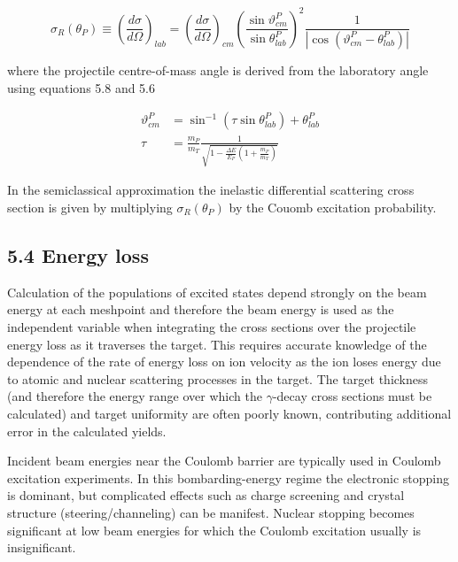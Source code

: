 \documentclass[10pt]{article}
\begin{document}
\begin{equation*}
\sigma_{R}\left(\theta_{P}\right) \equiv\left(\frac{d \sigma}{d \Omega}\right)_{l a b}=\left(\frac{d \sigma}{d \Omega}\right)_{c m}\left(\frac{\sin \vartheta_{c m}^{P}}{\sin \theta_{l a b}^{P}}\right)^{2} \frac{1}{\left|\cos \left(\vartheta_{c m}^{P}-\theta_{l a b}^{P}\right)\right|} \tag{5.26}
\end{equation*}


where the projectile centre-of-mass angle is derived from the laboratory angle using equations 5.8 and 5.6


\begin{align*}
\vartheta_{c m}^{P} & =\sin ^{-1}\left(\tau \sin \theta_{l a b}^{P}\right)+\theta_{l a b}^{P}  \tag{5.8}\\
\tau & =\frac{m_{P}}{m_{T}} \frac{1}{\sqrt{1-\frac{\Delta E}{E_{P}}\left(1+\frac{m_{P}}{m_{T}}\right)}} \tag{5.6}
\end{align*}


In the semiclassical approximation the inelastic differential scattering cross section is given by multiplying $\sigma_{R}\left(\theta_{P}\right)$ by the Couomb excitation probability.

\subsection*{5.4 Energy loss}
Calculation of the populations of excited states depend strongly on the beam energy at each meshpoint and therefore the beam energy is used as the independent variable when integrating the cross sections over the projectile energy loss as it traverses the target. This requires accurate knowledge of the dependence of the rate of energy loss on ion velocity as the ion loses energy due to atomic and nuclear scattering processes in the target. The target thickness (and therefore the energy range over which the $\gamma$-decay cross sections must be calculated) and target uniformity are often poorly known, contributing additional error in the calculated yields.

Incident beam energies near the Coulomb barrier are typically used in Coulomb excitation experiments. In this bombarding-energy regime the electronic stopping is dominant, but complicated effects such as charge screening and crystal structure (steering/channeling) can be manifest. Nuclear stopping becomes significant at low beam energies for which the Coulomb excitation usually is insignificant.
\end{document}
